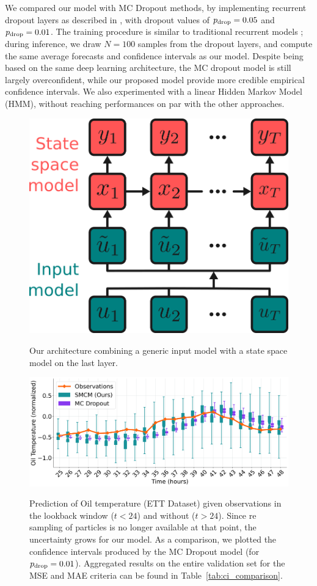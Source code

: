 \documentclass[journal]{IEEEtran}
\begin{document}
We compared our model with MC Dropout methods, by implementing recurrent dropout layers as described in \cite{Gal2016NIPS}, with dropout values of $p_\textnormal{drop}=0.05$ and $p_\textnormal{drop}=0.01$.
The training procedure is similar to traditional recurrent models ; during inference, we draw $N=100$ samples from the dropout layers, and compute the same average forecasts and confidence intervals as our model.
Despite being based on the same deep learning architecture, the MC dropout model is still largely overconfident, while our proposed model provide more credible empirical confidence intervals.
We also experimented with a linear Hidden Markov Model (HMM), without reaching performances on par with the other approaches.

\begin{figure}[htpb]
	\centering
	\caption{Our architecture combining a generic input model with a state space model on the last layer.}
	\includegraphics[width=0.7\linewidth]{architecture.png}
	\label{fig:architecture}
\end{figure}

\begin{figure}[htpb]
	\centering
	\caption{Prediction of Oil temperature (ETT Dataset) given observations in the lookback window ($t<24$) and without ($t>24$).
		Since re sampling of particles is no longer available at that point, the uncertainty grows for our model.
		As a comparison, we plotted the confidence intervals produced by the MC Dropout model (for $p_\textnormal{drop}=0.01$).
		Aggregated results on the entire validation set for the MSE and MAE criteria can be found in Table~\ref{tab:ci_comparison}.}
	\includegraphics[width=\linewidth]{filter_kp24_ett.png}
	\label{fig:filter_k+24}
\end{figure}
\end{document}
